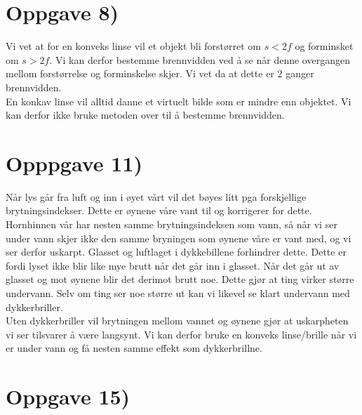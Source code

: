\documentclass[a4paper,norsk, 10pt]{article}
\begin{document}
\section*{Oppgave 8)}

Vi vet at for en konveks linse vil et objekt bli forstørret om $s < 2f$ og forminsket om $s>2f$. Vi kan derfor bestemme brennvidden ved å se når denne overgangen mellom forstørrelse og forminskelse skjer. Vi vet da at dette er 2 ganger brennvidden.\\

En konkav linse vil alltid danne et virtuelt bilde som er mindre enn objektet. Vi kan derfor ikke bruke metoden over til å bestemme brennvidden.

\section*{Opppgave 11)}

Når lys går fra luft og inn i øyet vårt vil det bøyes litt pga forskjellige brytningsindekser. Dette er øynene våre vant til og korrigerer for dette. Hornhinnen vår har nesten samme brytningsindeksen som vann, så når vi ser under vann skjer ikke den samme bryningen som øynene våre er vant med, og vi ser derfor uskarpt. Glasset og luftlaget i dykkebillene forhindrer dette. Dette er fordi lyset ikke blir like mye brutt når det går inn i glasset. Når det går ut av glasset og mot øynene blir det derimot brutt noe. Dette gjør at ting virker større undervann. Selv om ting ser noe større ut kan vi likevel se klart undervann med dykkerbriller.\\

Uten dykkerbriller vil brytningen mellom vannet og øynene gjør at uskarpheten vi ser tilsvarer å være langsynt. Vi kan derfor bruke en konveks linse/brille når vi er under vann og få nesten samme effekt som dykkerbrillne.

\section*{Oppgave 15)}
\end{document}
